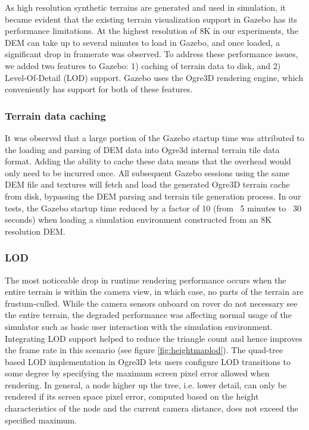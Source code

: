 \documentclass[twocolumn,letterpaper]{IEEEAerospaceCLS}  %
\begin{document}
As high resolution synthetic terrains are generated and used in simulation, it became evident that the existing terrain visualization support in Gazebo has its performance limitations. At the highest resolution of 8K in our experiments, the DEM can take up to several minutes to load in Gazebo, and once loaded, a significant drop in framerate was observed. To address these performance issues, we added two features to Gazebo: 1) caching of terrain data to disk, and 2) Level-Of-Detail (LOD) support. Gazebo uses the Ogre3D rendering engine, which conveniently has support for both of these features. 

\subsubsection{Terrain data caching}

It was observed that a large portion of the Gazebo startup time was attributed to the loading and parsing of DEM data into Ogre3d internal terrain tile data format. Adding the ability to cache these data means that the overhead would only need to be incurred once. All subsequent Gazebo sessions using the same DEM file and textures will fetch and load the generated Ogre3D terrain cache from disk, bypassing the DEM parsing and terrain tile generation process. In our tests, the Gazebo startup time reduced by a factor of 10 (from ~5 minutes to ~30 seconds) when loading a simulation environment constructed from an 8K resolution DEM.

\subsubsection{LOD}

The most noticeable drop in runtime rendering performance occurs when the entire terrain is within the camera view, in which case, no parts of the terrain are frustum-culled. While the camera sensors onboard on rover do not necessary see the entire terrain, the degraded performance was affecting normal usage of the simulator such as basic user interaction with the simulation environment. Integrating LOD support helped to reduce the triangle count and hence improves the frame rate in this scenario (see figure \ref{fig:heightmaplod}). The quad-tree based LOD implementation in Ogre3D lets users configure LOD transitions to some degree by specifying the maximum screen pixel error allowed when rendering. In general, a node higher up the tree, i.e. lower detail, can only be rendered if its screen space pixel error, computed based on the height characteristics of the node and the current camera distance, does not exceed the specified maximum. 
\end{document}
